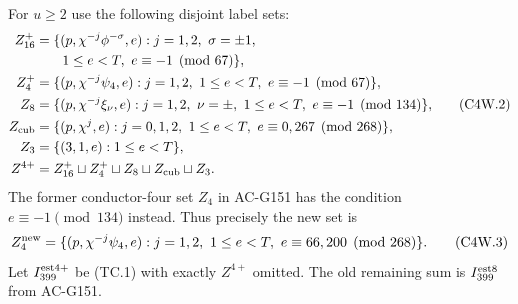 For $u\geq2$ use the following disjoint label sets:
\[
 \begin{aligned}
 Z_{16}^+&=\{(p,\chi^{-j}\phi^{-\sigma},e):
   j=1,2,\ \sigma=\pm1,\\
 &\hspace{2em}1\leq e<T,\ e\equiv-1\pmod{67}\},\\
 Z_4^+&=\{(p,\chi^{-j}\psi_4,e):
   j=1,2,\ 1\leq e<T,\ e\equiv-1\pmod{67}\},\\
 Z_8&=\{(p,\chi^{-j}\xi_\nu,e):
   j=1,2,\ \nu=\pm,\ 1\leq e<T,\ e\equiv-1\pmod{134}\},\\
 Z_{\rm cub}&=\{(p,\chi^j,e):j=0,1,2,
   \ 1\leq e<T,\ e\equiv0,267\pmod{268}\},\\
 Z_3&=\{(3,1,e):1\leq e<T\},\\
 Z^{4+}&=Z_{16}^+\sqcup Z_4^+\sqcup Z_8\sqcup Z_{\rm cub}\sqcup Z_3.
 \end{aligned}
 \tag{C4W.2}
\]
The former conductor-four set $Z_4$ in AC-G151 has the condition
$e\equiv-1\pmod{134}$ instead.  Thus precisely the new set is
\[
 Z_4^{\rm new}=\{(p,\chi^{-j}\psi_4,e):j=1,2,
       \ 1\leq e<T,\ e\equiv66,200\pmod{268}\}.
 \tag{C4W.3}
\]
Let $I_{399}^{\rm est4+}$ be (TC.1) with exactly $Z^{4+}$ omitted.
The old remaining sum is $I_{399}^{\rm est8}$ from AC-G151.


